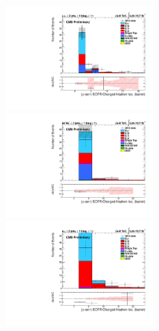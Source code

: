 \begin{figure} \label{fig-SCFRChargedHadronIso}
\begin{center}
\includegraphics[width=0.5\textwidth]{Plots/ControlPlots/TTbarPhotonAnalysis/MuMu/Photons/SignalPhotons/Photon_RhoCorrectedSCChIso_barrel_splitTTbar_ratio.pdf}
\includegraphics[width=0.5\textwidth]{Plots/ControlPlots/TTbarPhotonAnalysis/EE/Photons/SignalPhotons/Photon_RhoCorrectedSCChIso_barrel_splitTTbar_ratio.pdf}
\includegraphics[width=0.5\textwidth]{Plots/ControlPlots/TTbarPhotonAnalysis/EMu/Photons/SignalPhotons/Photon_RhoCorrectedSCChIso_barrel_splitTTbar_ratio.pdf}
\caption{}
\end{center}
\end{figure}



